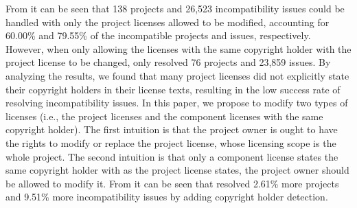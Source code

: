 From  it can be seen that %
{138} projects and {26,523} incompatibility issues could be handled with only the project licenses allowed to be modified, accounting for {60.00\%} and {79.55\%} of the incompatible projects and issues, respectively. %
However, when only allowing the licenses with the same copyright holder with the project license to be changed, \tool only resolved {76} projects and {23,859} issues. By analyzing the results, we found that many project licenses did not explicitly state their copyright holders in their license texts, resulting in the low success rate of resolving incompatibility issues. 
%
In this paper, we propose to modify two types of licenses (i.e., the project licenses and the component licenses with the same copyright holder). The first intuition is that the project owner is ought to have the rights to modify or replace the project license, whose licensing scope is the whole project. The second intuition is that only a component license states the same copyright holder with as the project license states, the project owner should be allowed to modify it. From  it can be seen that \tool resolved 2.61\% more projects and 9.51\% more incompatibility issues by adding copyright holder detection.

